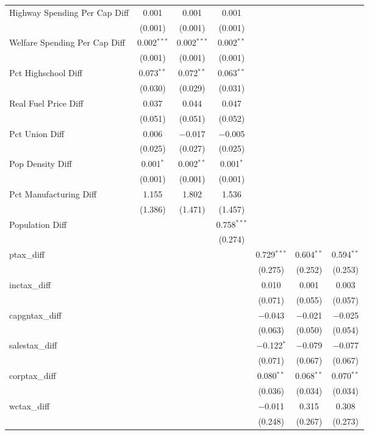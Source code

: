 \begin{table}[!htbp]
\begin{tabular}{@{\extracolsep{5pt}}lcccccc}
  Highway Spending Per Cap Diff & 0.001 & 0.001 & 0.001 &  &  &  \\ 
  & (0.001) & (0.001) & (0.001) &  &  &  \\ 
  Welfare Spending Per Cap Diff & 0.002$^{***}$ & 0.002$^{***}$ & 0.002$^{**}$ &  &  &  \\ 
  & (0.001) & (0.001) & (0.001) &  &  &  \\ 
  Pct Highschool Diff & 0.073$^{**}$ & 0.072$^{**}$ & 0.063$^{**}$ &  &  &  \\ 
  & (0.030) & (0.029) & (0.031) &  &  &  \\ 
  Real Fuel Price Diff & 0.037 & 0.044 & 0.047 &  &  &  \\ 
  & (0.051) & (0.051) & (0.052) &  &  &  \\ 
  Pct Union Diff & 0.006 & $-$0.017 & $-$0.005 &  &  &  \\ 
  & (0.025) & (0.027) & (0.025) &  &  &  \\ 
  Pop Density Diff & 0.001$^{*}$ & 0.002$^{**}$ & 0.001$^{*}$ &  &  &  \\ 
  & (0.001) & (0.001) & (0.001) &  &  &  \\ 
  Pct Manufacturing Diff & 1.155 & 1.802 & 1.536 &  &  &  \\ 
  & (1.386) & (1.471) & (1.457) &  &  &  \\ 
  Population Diff &  &  & 0.758$^{***}$ &  &  &  \\ 
  &  &  & (0.274) &  &  &  \\ 
  ptax\_diff &  &  &  & 0.729$^{***}$ & 0.604$^{**}$ & 0.594$^{**}$ \\ 
  &  &  &  & (0.275) & (0.252) & (0.253) \\ 
  inctax\_diff &  &  &  & 0.010 & 0.001 & 0.003 \\ 
  &  &  &  & (0.071) & (0.055) & (0.057) \\ 
  capgntax\_diff &  &  &  & $-$0.043 & $-$0.021 & $-$0.025 \\ 
  &  &  &  & (0.063) & (0.050) & (0.054) \\ 
  salestax\_diff &  &  &  & $-$0.122$^{*}$ & $-$0.079 & $-$0.077 \\ 
  &  &  &  & (0.071) & (0.067) & (0.067) \\ 
  corptax\_diff &  &  &  & 0.080$^{**}$ & 0.068$^{**}$ & 0.070$^{**}$ \\ 
  &  &  &  & (0.036) & (0.034) & (0.034) \\ 
  wctax\_diff &  &  &  & $-$0.011 & 0.315 & 0.308 \\ 
  &  &  &  & (0.248) & (0.267) & (0.273) \\ 

\end{tabular}
\end{table}
